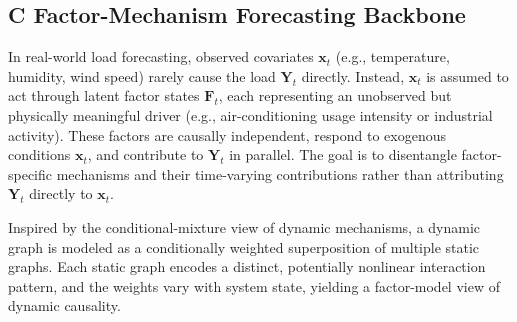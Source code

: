﻿\documentclass[journal]{IEEEtran}
\DeclareRobustCommand{\oldtext}[1]{{\color{revisionred}#1}}
\DeclareRobustCommand{\newtext}[1]{{\color{revisionblue}#1}}
\DeclareRobustCommand{\why}[1]{{\color{revisionblue}{\footnotesize (#1)}}}
\DeclareRobustCommand{\rw}[3]{\oldtext{#1} \newtext{#2}\why{#3}}
\begin{document}






\subsection{\rw{C}{Factor-Mechanism Forecasting Backbone}{替换占位小节标题。}}
In real-world load forecasting, observed covariates $\mathbf{x}_t$ (e.g., temperature, humidity, wind speed) rarely cause the load $\mathbf{Y}_t$ directly. Instead, $\mathbf{x}_t$ is assumed to act through latent factor states $\mathbf{F}_t$, each representing an unobserved but physically meaningful driver (e.g., air-conditioning usage intensity or industrial activity). These factors are causally independent, respond to exogenous conditions $\mathbf{x}_t$, and contribute to $\mathbf{Y}_t$ in parallel. The goal is to disentangle factor-specific mechanisms and their time-varying contributions rather than attributing $\mathbf{Y}_t$ directly to $\mathbf{x}_t$. 

Inspired by the conditional-mixture view of dynamic mechanisms, a dynamic graph is modeled as a conditionally weighted superposition of multiple static graphs. Each static graph encodes a distinct, potentially nonlinear interaction pattern, and the weights vary with system state, yielding a factor-model view of dynamic causality.
\end{document}
